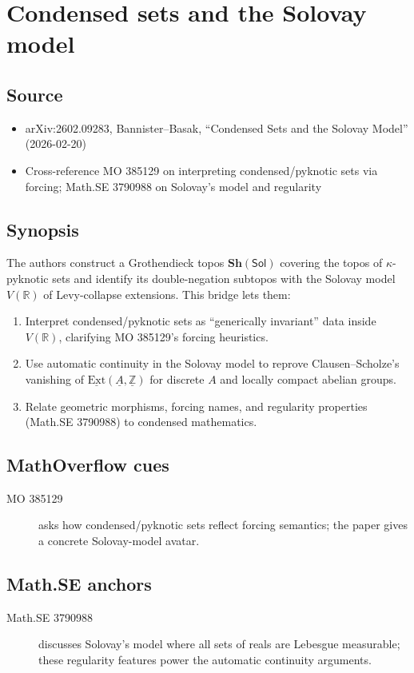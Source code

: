 \section*{Condensed sets and the Solovay model}
\subsection*{Source}
\begin{itemize}
  \item arXiv:2602.09283, Bannister--Basak, ``Condensed Sets and the Solovay Model'' (2026-02-20)
  \item Cross-reference MO 385129 on interpreting condensed/pyknotic sets via forcing; Math.SE 3790988 on Solovay’s model and regularity
\end{itemize}
\subsection*{Synopsis}
The authors construct a Grothendieck topos $\mathbf{Sh}(\mathsf{Sol})$ covering the topos of $\kappa$-pyknotic sets and identify its double-negation subtopos with the Solovay model $V(\mathbb{R})$ of Levy-collapse extensions. This bridge lets them:
\begin{enumerate}
  \item Interpret condensed/pyknotic sets as ``generically invariant'' data inside $V(\mathbb{R})$, clarifying MO 385129’s forcing heuristics.
  \item Use automatic continuity in the Solovay model to reprove Clausen--Scholze’s vanishing of $\underline{\mathrm{Ext}}(\underline{A},\underline{\mathbb{Z}})$ for discrete $A$ and locally compact abelian groups.
  \item Relate geometric morphisms, forcing names, and regularity properties (Math.SE 3790988) to condensed mathematics.
\end{enumerate}
\subsection*{MathOverflow cues}
\begin{description}
  \item[MO 385129] asks how condensed/pyknotic sets reflect forcing semantics; the paper gives a concrete Solovay-model avatar.
\end{description}
\subsection*{Math.SE anchors}
\begin{description}
  \item[Math.SE 3790988] discusses Solovay’s model where all sets of reals are Lebesgue measurable; these regularity features power the automatic continuity arguments.
\end{description}
